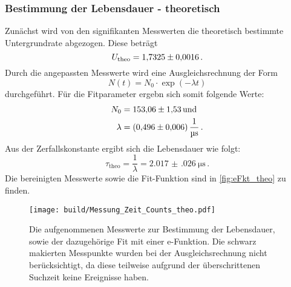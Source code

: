   \subsubsection{Bestimmung der Lebensdauer - theoretisch}
    Zunächst wird von den signifikanten Messwerten die theoretisch bestimmte Untergrundrate abgezogen.
    Diese beträgt
    \begin{equation*}
      U_\text{theo} = \num{1.7325 \pm 0.0016} \, .
    \end{equation*}
    Durch die angepassten Messwerte wird eine Ausgleichsrechnung der Form
    \begin{equation*}
      N(t) = N_0 \cdot \exp(-\lambda t)
    \end{equation*}
    durchgeführt.
    Für die Fitparameter ergebn sich somit folgende Werte:
    \begin{align*}
      N_0 &= \num{153.06 \pm 1.53} \, \text{und}\\
      \lambda &= \SI{0.496(006)}{\per\micro\second} \, .
    \end{align*}
    Aus der Zerfallskonstante ergibt sich die Lebensdauer wie folgt:
    \begin{equation*}
      \tau_\text{theo} = \frac{1}{\lambda} = \SI{2.017(026)}{\micro\second} \, .
    \end{equation*}
    Die bereinigten Messwerte sowie die Fit-Funktion sind in \autoref{fig:eFkt_theo} zu finden.
    \begin{figure}[h]
      \centering
      \texttt{[image: build/Messung\_Zeit\_Counts\_theo.pdf]}
      \caption{Die aufgenommenen Messwerte zur Bestimmung der Lebensdauer, sowie der dazugehörige Fit mit einer e-Funktion.
                Die schwarz makierten Messpunkte wurden bei der Ausgleichsrechnung nicht berücksichtigt, da diese teilweise aufgrund der überschrittenen Suchzeit keine Ereignisse haben.}
      \label{fig:eFkt_theo}
    \end{figure}